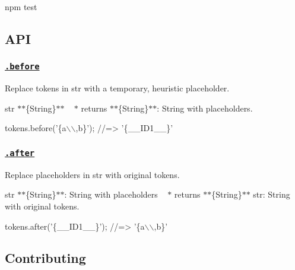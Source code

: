 \begin{DoxyCode}
npm test
\end{DoxyCode}


\subsection*{A\+PI}

\subsubsection*{\href{index.js#L23}{\tt .before}}

Replace tokens in {\ttfamily str} with a temporary, heuristic placeholder.


\begin{DoxyItemize}
\item {\ttfamily str} $\ast$$\ast$\{String\}$\ast$$\ast$ ~\newline
$\ast$ {\ttfamily returns} $\ast$$\ast$\{String\}$\ast$$\ast$\+: String with placeholders. ~\newline
 
\begin{DoxyCode}
tokens.before('\{a\(\backslash\)\(\backslash\),b\}');
//=> '\{\_\_ID1\_\_\}'
\end{DoxyCode}

\end{DoxyItemize}

\subsubsection*{\href{index.js#L44}{\tt .after}}

Replace placeholders in {\ttfamily str} with original tokens.


\begin{DoxyItemize}
\item {\ttfamily str} $\ast$$\ast$\{String\}$\ast$$\ast$\+: String with placeholders ~\newline
$\ast$ {\ttfamily returns} $\ast$$\ast$\{String\}$\ast$$\ast$ {\ttfamily str}\+: String with original tokens. ~\newline
 
\begin{DoxyCode}
tokens.after('\{\_\_ID1\_\_\}');
//=> '\{a\(\backslash\)\(\backslash\),b\}'
\end{DoxyCode}

\end{DoxyItemize}

\subsection*{Contributing}

